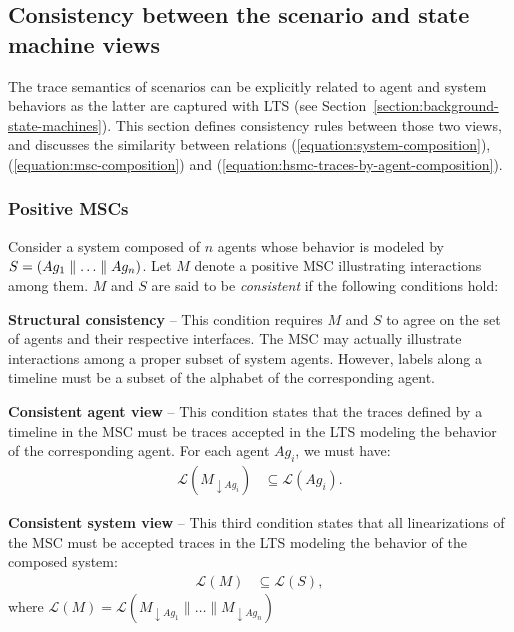 \subsection{Consistency between the scenario and state machine views\label{subsection:background-scenario-consistency}}

The trace semantics of scenarios can be explicitly related to agent and system behaviors as the latter are captured with LTS (see Section~\ref{section:background-state-machines}). This section defines consistency rules between those two views, and discusses the similarity between relations (\ref{equation:system-composition}), (\ref{equation:msc-composition}) and (\ref{equation:hsmc-traces-by-agent-composition}).

\subsubsection*{Positive MSCs}

Consider a system composed of $n$ agents whose behavior is modeled by $S = (Ag_1 \parallel \ldots \parallel Ag_n)$. Let $M$ denote a positive MSC illustrating interactions among them. $M$ and $S$ are said to be \emph{consistent} if the following conditions hold:

\noindent \textbf{Structural consistency} -- This condition requires $M$ and $S$ to agree on the set of agents and their respective interfaces. The MSC may actually illustrate interactions among a proper subset of system agents. However, labels along a timeline must be a subset of the alphabet of the corresponding agent.

\noindent \textbf{Consistent agent view} -- This condition states that the traces defined by a timeline in the MSC must be traces accepted in the LTS modeling the behavior of the corresponding agent. For each agent $Ag_i$, we must have:
\begin{align}\mathcal{L}(M_{\downarrow Ag_i}) & \subseteq \mathcal{L}(Ag_i)\label{condition:consistent-agent-view}.\end{align}

\noindent \textbf{Consistent system view} -- This third condition states that all linearizations of the MSC must be accepted traces in the LTS modeling the behavior of the composed system:
\begin{align}\mathcal{L}(M) & \subseteq \mathcal{L}(S)\label{condition:consistent-system-view},\end{align}
where $\mathcal{L}(M) = \mathcal{L}(M_{\downarrow Ag_1} \parallel \ldots \parallel M_{\downarrow Ag_n})$

